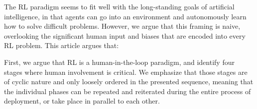 \documentclass[twoside,11pt]{article}
\begin{document}
The RL paradigm seems to fit well with the long-standing goals of artificial intelligence, in that agents can go into an environment and autonomously learn how to solve difficult problems. However, we argue that this framing is naive, overlooking the significant human input and biases that are encoded into every RL problem. This article argues that: 
\begin{center}
\end{center}

First, we argue that RL is a human-in-the-loop paradigm, and identify four stages where human involvement is critical. We emphasize that those stages are of cyclic nature and only loosely ordered in the presented sequence, meaning that the individual phases can be repeated and reiterated during the entire process of deployment, or take place in parallel to each other.
\end{document}
